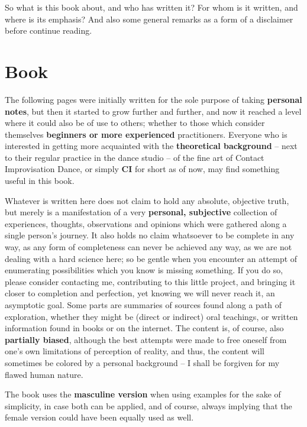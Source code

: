 So what is this book about, and who has written it?
For whom is it written, and where is its emphasis?
And also some general remarks as a form of a disclaimer before continue reading.

\section{Book}\label{sec:book}

The following pages were initially written for the sole purpose of taking \textbf{personal notes}, but then it started to grow further and further, and now it reached a level where it could also be of use to others; whether to those which consider themselves \textbf{beginners or more experienced} practitioners.
Everyone who is interested in getting more acquainted with the \textbf{theoretical background} -- next to their regular practice in the dance studio -- of the fine art of Contact Improvisation Dance, or simply \textbf{CI} for short as of now, may find something useful in this book.

Whatever is written here does not claim to hold any absolute, objective truth, but merely is a manifestation of a very \textbf{personal, subjective} collection of experiences, thoughts, observations and opinions which were gathered along a single person's journey.
It also holds no claim whatsoever to be complete in any way, as any form of completeness can never be achieved any way, as we are not dealing with a hard science here; so be gentle when you encounter an attempt of enumerating possibilities which you know is missing something.
If you do so, please consider contacting me, contributing to this little project, and bringing it closer to completion and perfection, yet knowing we will never reach it, an asymptotic goal.
Some parts are summaries of sources found along a path of exploration, whether they might be (direct or indirect) oral teachings, or written information found in books or on the internet.
The content is, of course, also \textbf{partially biased}, although the best attempts were made to free oneself from one's own limitations of perception of reality, and thus, the content will sometimes be colored by a personal background -- I shall be forgiven for my flawed human nature.

The book uses the \textbf{masculine version} when using examples for the sake of simplicity, in case both can be applied, and of course, always implying that the female version could have been equally used as well.

